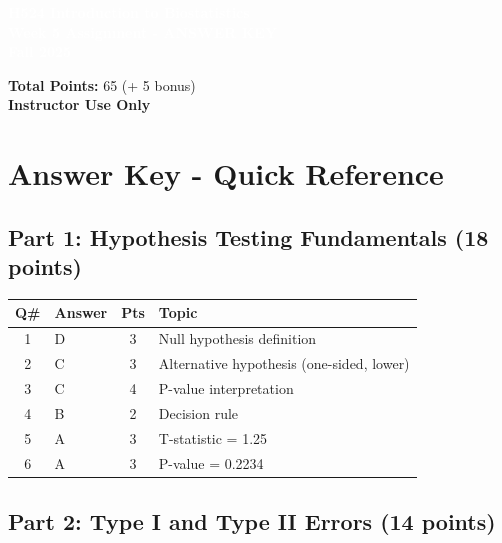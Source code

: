 \documentclass[11pt]{article}
\title{}
\author{}
\date{}
\begin{document}
\begin{tcolorbox}[colback=osaorange,colframe=black,boxrule=2pt,arc=0pt,left=3pt,right=3pt,top=6pt,bottom=6pt,boxsep=2pt]
\centering
\textcolor{white}{\textbf{\Large H524 Introduction to Biostatistics}}\\
\textcolor{white}{\textbf{\Large Week 5 Assignment - ANSWER KEY}}\\
\textcolor{white}{\textbf{\Large Fall 2025}}
\end{tcolorbox}

\vspace{8pt}

\noindent\textbf{Total Points:} 65 (+ 5 bonus)\\
\textbf{Instructor Use Only}

\section*{Answer Key - Quick Reference}

\subsection*{Part 1: Hypothesis Testing Fundamentals (18 points)}

\begin{table}[h]
\begin{tabular}{clcp{8cm}}
\toprule
\textbf{Q\#} & \textbf{Answer} & \textbf{Pts} & \textbf{Topic} \\
\midrule
1 & \textcolor{correctgreen}{D} & 3 & Null hypothesis definition \\
2 & \textcolor{correctgreen}{C} & 3 & Alternative hypothesis (one-sided, lower) \\
3 & \textcolor{correctgreen}{C} & 4 & P-value interpretation \\
4 & \textcolor{correctgreen}{B} & 2 & Decision rule \\
5 & \textcolor{correctgreen}{A} & 3 & T-statistic = 1.25 \\
6 & \textcolor{correctgreen}{A} & 3 & P-value = 0.2234 \\
\bottomrule
\end{tabular}
\end{table}

\subsection*{Part 2: Type I and Type II Errors (14 points)}
\end{document}
